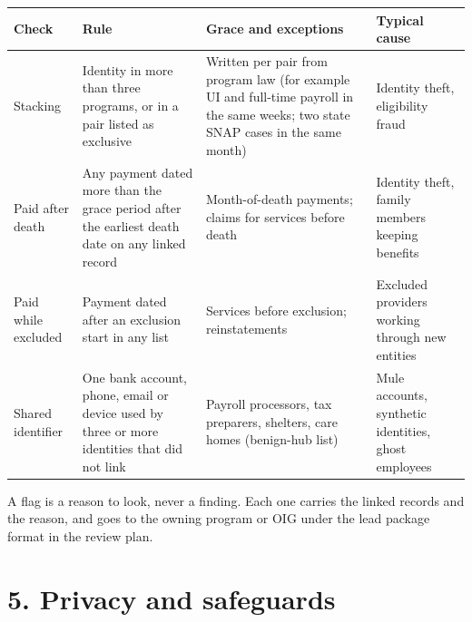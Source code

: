 \documentclass[letterpaper,11pt]{article}
\begin{document}
\begingroup\small\setlength{\tabcolsep}{4pt}\renewcommand{\arraystretch}{1.25}
\begin{longtable}[l]{@{}>{\raggedright\arraybackslash}p{}>{\raggedright\arraybackslash}p{}>{\raggedright\arraybackslash}p{}>{\raggedright\arraybackslash}p{}@{}}
\rowcolor{coolblack}\leavevmode\color{white}\bfseries Check & \leavevmode\color{white}\bfseries Rule & \leavevmode\color{white}\bfseries Grace and exceptions & \leavevmode\color{white}\bfseries Typical cause \\
\endhead
Stacking & Identity in more than three programs, or in a pair listed as exclusive & Written per pair from program law (for example UI and full-time payroll in the same weeks; two state SNAP cases in the same month) & Identity theft, eligibility fraud \\
Paid after death & Any payment dated more than the grace period after the earliest death date on any linked record & Month-of-death payments; claims for services before death & Identity theft, family members keeping benefits \\
Paid while excluded & Payment dated after an exclusion start in any list & Services before exclusion; reinstatements & Excluded providers working through new entities \\
Shared identifier & One bank account, phone, email or device used by three or more identities that did not link & Payroll processors, tax preparers, shelters, care homes (benign-hub list) & Mule accounts, synthetic identities, ghost employees \\
\end{longtable}\endgroup

A flag is a reason to look, never a finding. Each one carries the linked
records and the reason, and goes to the owning program or OIG under the
lead package format in the review plan.

\hypertarget{privacy-and-safeguards}{%
\section*{5. Privacy and safeguards}\label{privacy-and-safeguards}}
\end{document}
